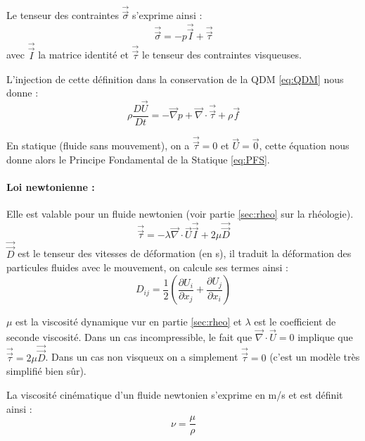 
Le tenseur des contraintes $\vec{\vec{\sigma}}$ s'exprime ainsi :
%
\begin{equation}
\vec{\vec{\sigma}} = - p \vec{\vec{I}} + \vec{\vec{\tau}}
\end{equation}
%
avec $\vec{\vec{I}}$ la matrice identité et $\vec{\vec{\tau}}$ le tenseur des contraintes visqueuses.

L'injection de cette définition dans la conservation de la QDM \eqref{eq:QDM} nous donne :
%
\begin{equation}
\rho \frac{D\vec{U}}{Dt} = - \vec{\nabla} p + \vec{\nabla} \cdot \vec{\vec{\tau}} + \rho \vec{f}
\end{equation}

En statique (fluide sans mouvement), on a $\vec{\vec{\tau}} = 0$ et $\vec{U} = \vec{0}$, cette équation nous donne alors le Principe Fondamental de la Statique \eqref{eq:PFS}.

\paragraph{Loi newtonienne :}Elle est valable pour un fluide newtonien (voir partie \ref{sec:rheo} sur la rhéologie).
%
\begin{equation}
\vec{\vec{\tau}} = - \lambda \vec{\nabla} \cdot \vec{U} \vec{\vec{I}} + 2\mu \vec{\vec{D}}
\end{equation}
%
$\vec{\vec{D}}$ est le tenseur des vitesses de déformation (en s), il traduit la déformation des particules fluides avec le mouvement, on calcule ses termes ainsi :
%
\begin{equation}
D_{ij} = \frac{1}{2} \left( \frac{\partial{U_i}}{\partial{x_j}} + \frac{\partial{U_j}}{\partial{x_i}} \right)
\end{equation}

$\mu$ est la viscosité dynamique vur en partie \ref{sec:rheo} et $\lambda$ est le coefficient de seconde viscosité. Dans un cas incompressible, le fait que $\vec{\nabla} \cdot \vec{U} = 0$ implique que $\vec{\vec{\tau}} = 2 \mu \vec{\vec{D}}$. Dans un cas non visqueux on a simplement $\vec{\vec{\tau}} = 0$ (c'est un modèle très simplifié bien sûr).

La viscosité cinématique d'un fluide newtonien s'exprime en m/s et est définit ainsi :
%
\begin{equation}
\nu = \frac{\mu}{\rho}
\end{equation}

